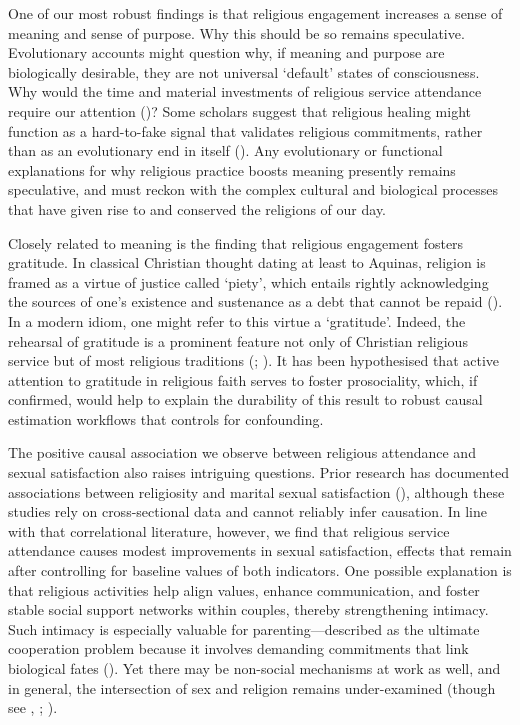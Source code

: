 \documentclass[
  single column]{article}
\begin{document}
One of our most robust findings is that religious engagement increases a
sense of meaning and sense of purpose. Why this should be so remains
speculative. Evolutionary accounts might question why, if meaning and
purpose are biologically desirable, they are not universal `default'
states of consciousness. Why would the time and material investments of
religious service attendance require our attention
()? Some
scholars suggest that religious healing might function as a hard-to-fake
signal that validates religious commitments, rather than as an
evolutionary end in itself (). Any evolutionary or functional explanations for why religious
practice boosts meaning presently remains speculative, and must reckon
with the complex cultural and biological processes that have given rise
to and conserved the religions of our day.

Closely related to meaning is the finding that religious engagement
fosters gratitude. In classical Christian thought dating at least to
Aquinas, religion is framed as a virtue of justice called `piety', which
entails rightly acknowledging the sources of one's existence and
sustenance as a debt that cannot be repaid
(). In a modern
idiom, one might refer to this virtue a `gratitude'. Indeed, the
rehearsal of gratitude is a prominent feature not only of Christian
religious service but of most religious traditions
(;
).
It has been hypothesised that active attention to gratitude in religious
faith serves to foster prosociality, which, if confirmed, would help to
explain the durability of this result to robust causal estimation
workflows that controls for confounding.

The positive causal association we observe between religious attendance
and sexual satisfaction also raises intriguing questions. Prior research
has documented associations between religiosity and marital sexual
satisfaction (),
although these studies rely on cross-sectional data and cannot reliably
infer causation. In line with that correlational literature, however, we
find that religious service attendance causes modest improvements in
sexual satisfaction, effects that remain after controlling for baseline
values of both indicators. One possible explanation is that religious
activities help align values, enhance communication, and foster stable
social support networks within couples, thereby strengthening intimacy.
Such intimacy is especially valuable for parenting---described as the
ultimate cooperation problem because it involves demanding commitments
that link biological fates
(). Yet there may be
non-social mechanisms at work as well, and in general, the intersection
of sex and religion remains under-examined (though see
,
;
).
\end{document}
